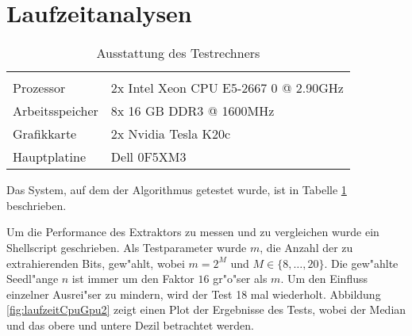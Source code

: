 \section{Laufzeitanalysen}
\begin{table}[b]
	\centering
	\begin{tabular}{ll}
		\hline \hline
		\vspace{-3mm}\\
		Prozessor		& 2x Intel Xeon CPU E5-2667 0 @ 2.90GHz\\
		Arbeitsspeicher	& 8x 16 GB DDR3 @ 1600MHz\\
		Grafikkarte		& 2x Nvidia Tesla K20c\\
		Hauptplatine	& Dell 0F5XM3\\
		\hline
	\end{tabular}
	\caption{Ausstattung des Testrechners}
	\label{table:systemausstattung}
\end{table}

Das System, auf dem der Algorithmus getestet wurde, ist in Tabelle \ref{table:systemausstattung} beschrieben.

Um die Performance des Extraktors zu messen und zu vergleichen wurde ein Shellscript geschrieben. Als Testparameter wurde $m$, die Anzahl der zu extrahierenden Bits, gew"ahlt, wobei $m = 2^M$ und $M \in \{8, \dots, 20\}$. Die gew"ahlte Seedl"ange $n$ ist immer um den Faktor $16$ gr"o"ser als $m$. Um den Einfluss einzelner Ausrei"ser zu mindern, wird der Test 18 mal wiederholt. Abbildung \ref{fig:laufzeitCpuGpu2} zeigt einen Plot der Ergebnisse des Tests, wobei der Median und das obere und untere Dezil betrachtet werden.


